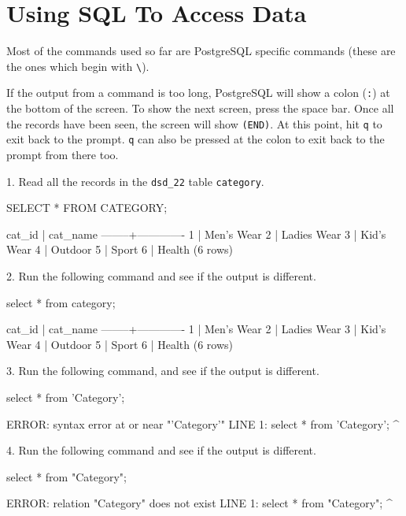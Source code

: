 \section*{Using SQL To Access Data}
Most of the commands used so far are PostgreSQL specific commands (these are the ones which begin with \verb|\|).

If the output from a command is too long, PostgreSQL will show a colon (\verb|:|) at the bottom of the screen. To show the next screen, press the space bar. Once all the records have been seen, the screen will show \verb|(END)|. At this point, hit \verb|q| to exit back to the prompt. \verb|q| can also be pressed at the colon to exit back to the prompt from there too.

1. Read all the records in the \verb|dsd_22| table \verb|category|.
\begin{sql}
SELECT * FROM CATEGORY;
\end{sql}
\begin{pseudo*}
cat_id |  cat_name   
--------+-------------
    1 | Men's Wear
    2 | Ladies Wear
    3 | Kid's Wear
    4 | Outdoor
    5 | Sport
    6 | Health
(6 rows)
\end{pseudo*}

2. Run the following command and see if the output is different.
\begin{sql}
select * from category;
\end{sql}
\begin{pseudo*}
cat_id |  cat_name   
--------+-------------
    1 | Men's Wear
    2 | Ladies Wear
    3 | Kid's Wear
    4 | Outdoor
    5 | Sport
    6 | Health
(6 rows)
\end{pseudo*}

3. Run the following command, and see if the output is different.
\begin{sql}
select * from 'Category';
\end{sql}
\begin{pseudo*}
ERROR:  syntax error at or near "'Category'"
LINE 1: select * from 'Category';
                      ^
\end{pseudo*}

4. Run the following command and see if the output is different.
\begin{sql}
select * from "Category";
\end{sql}
\begin{pseudo*}
ERROR:  relation "Category" does not exist
LINE 1: select * from "Category";
                      ^
\end{pseudo*}

